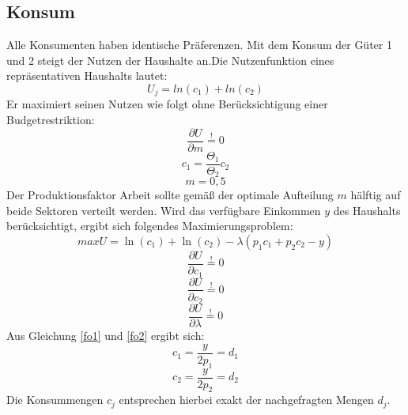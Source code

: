 \subsection{Konsum}
Alle Konsumenten haben identische Pr{\"a}ferenzen. Mit dem Konsum der Güter 1 und 2 steigt der Nutzen der Haushalte an.Die Nutzenfunktion eines repräsentativen Haushalts lautet: 
\begin{equation} U_j=ln(c_1)+ln(c_2)\label{NutzenAutarkie}\end{equation}
Er maximiert seinen Nutzen wie folgt ohne Ber{\"u}cksichtigung einer Budgetrestriktion: 
\begin{equation}\frac{\partial U}{\partial m}\overset{!}{=}0\end{equation} 
\begin{equation} c_1=\frac{\Theta_1}{\Theta_2}c_2\end{equation}
\begin {equation} m=0,5\end{equation}
Der Produktionsfaktor Arbeit sollte gemäß der optimale Aufteilung $m$ hälftig auf beide Sektoren verteilt werden.
Wird das verf{\"u}gbare Einkommen $y$ des Haushalts ber{\"u}cksichtigt, ergibt sich folgendes Maximierungsproblem: 
\begin{equation} maxU=\ln(c_1)+\ln(c_2)-\lambda (p_1c_1+p_2c_2-y)\end{equation}
\begin{equation}\frac{\partial U}{\partial c_1}\overset{!}{=}0\label{fo1}\end{equation}
\begin{equation} \frac{\partial U}{\partial c_2}\overset{!}{=}0\label{fo2}\end{equation}
\begin{equation} \frac{\partial U}{\partial \lambda}\overset{!}{=}0\end{equation}
Aus Gleichung \eqref{fo1} und \eqref{fo2} ergibt sich: 
\begin{equation} c_1=\frac{y}{2p_1}=d_1\end{equation}
\begin{equation} c_2=\frac{y}{2p_2}=d_2\end{equation}
Die Konsummengen $c_j$ entsprechen hierbei exakt der nachgefragten Mengen $d_j$.

